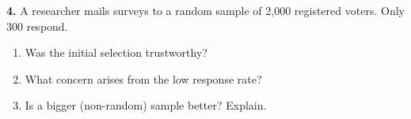 \documentclass[10pt]{article}
\begin{document}
\begin{practicebox}
\vspace{8pt}
\textbf{4.} A researcher mails surveys to a random sample of 2{,}000 registered
voters. Only 300 respond.

\begin{enumerate}[label=(\alph*), leftmargin=2em, itemsep=8pt]
  \item Was the initial selection trustworthy? \blank{3cm}
  \item What concern arises from the low response rate? \writeline\\[1pt]\writeline
  \item Is a bigger (non-random) sample better? Explain. \writeline\\[1pt]\writeline
\end{enumerate}
\end{practicebox}
\end{document}
